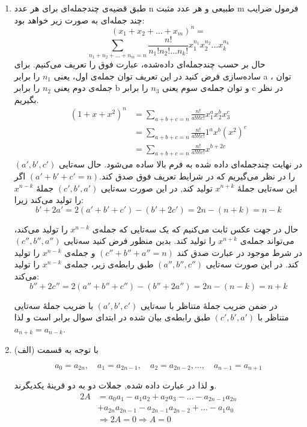 	\begin{enumerate}
		\item 
		طبق قضیه‌ی چندجمله‌ای برای هر عدد n طبیعی و هر عدد مثبت m فرمول ضرایب چند جمله‌ای به صورت زیر خواهد بود:
        $$(x_1+x_2+\ldots+x_m)^n = $$
        $$\sum_{n_1+n_2+\ldots+n_m=n} \frac{n!}{n_1!n_2!\ldots n_k!} x_1^{n_1}x_2^{n_2}\ldots x_k^{n_k}$$
        حال بر حسب چندجمله‌ای داده‌شده، عبارت فوق را تعریف می‌کنیم. برای ساده‌سازی فرض کنید در این تعریف توان جمله‌ی اول، یعنی
        $n_1$
        را برابر a ،
        توان جمله‌ی دوم یعنی 
        $n_2$
        را برابر 
        b
        و توان جمله‌ی سوم یعنی
        $n_3$
        را برابر c در نظر بگیریم.\\
        \begin{align*}
		(1+x+x^2)^n &= \sum_{a+b+c=n} \frac{n!}{a!b!c!} x_1^{a} x_2^{b} x_3^{c}\\
		&= \sum_{a+b+c=n} \frac{n!}{a!b!c!} 1^{a} x^{b} (x^2)^{c}\\
		&= \sum_{a+b+c=n} \frac{n!}{a!b!c!} x^{b + 2c}
        \end{align*}
		در نهایت چندجمله‌ای داده شده به فرم بالا ساده می‌شود.
		حال سه‌تایی $(a',b',c')$ را در نظر می‌گیریم که در شرایط تعریف فوق صدق کند.$(a'+b'+c' = n)$
        اگر این سه‌تایی  جملهٔ $x^{n + k}$ تولید کند, در این صورت سه‌تایی $(c', b', a')$ جملهٔ $x^{n - k}$ را تولید می‌کند زیرا:
        $$b' + 2a' = 2(a' + b' + c') - (b' + 2c') = 2n - (n + k) = n -k$$
        
        حال در جهت عکس ثابت می‌کنیم که یک سه‌تایی که جمله‌ی
        $x^{n-k}$
        را تولید می‌کند، می‌تواند جمله‌ی
        $x^{n+k}$
        را تولید کند. بدین منظور فرض کنید سه‌تایی
        $(c'', b'', a'')$
        در شرط موجود در عبارت صدق کند
        $(c''+b''+a''=n)$
        و جمله‌ی
        $x^{n-k}$
        را تولید کند.
        در این صورت سه‌تایی
        $(a'',b'',c'')$
        طبق رابطه‌ی زیر، جمله‌ی 
        $x^{n-k}$
        را تولید می‌کند:
    	$$b'' + 2c'' = 2(a'' + b'' + c'') - (b'' + 2a'') = 2n - (n - k) = n +k$$
	
    	در ضمن ضریب جملهٔ متناظر با سه‌تایی $(a', b', c')$ با ضریب جملهٔ سه‌تایی متناظر با $(c', b', a')$ طبق رابطه‌ی بیان شده در ابتدای سوال برابر است و لذا $a_{n + k} = a_{n - k}$.
	
	\item
    	با توجه به قسمت (الف) 
    
    	$$a_0 = a_{2n},\quad a_1 = a_{2n - 1},\quad a_2 = a_{2n - 2}, \dots ,\quad a_{n - 1} = a_{n + 1}$$
    
    	و لذا در عبارت داده شده, جملات دو به دو قرینهٔ یکدیگرند.
    	\begin{align*}
    		2A &= a_0a_1 - a_1a_2 + a_2a_3 - \dots - a_{2n-1}a_{2n}\\
    		&+ a_{2n}a_{2n-1} - a_{2n-1}a_{2n-2} +\dots - a_1a_0 \\
    		&\Rightarrow 2A = 0 \Rightarrow A = 0
    	\end{align*}
	

\end{enumerate}
